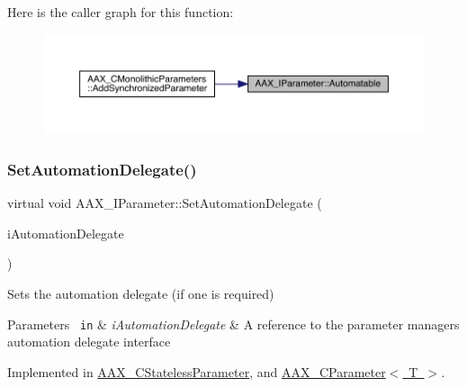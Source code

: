 Here is the caller graph for this function\+:
\nopagebreak
\begin{figure}[H]
\begin{center}
\leavevmode
\includegraphics[width=350pt]{a01857_a253ff336b79cfb454f07d4fa21f2884f_icgraph}
\end{center}
\end{figure}
\mbox{\label{a01857_a2c3dfdce09a2652f954ea6e4f9e12797}} 
\subsubsection{\texorpdfstring{SetAutomationDelegate()}{SetAutomationDelegate()}}
{\footnotesize\ttfamily virtual void A\+A\+X\+\_\+\+I\+Parameter\+::\+Set\+Automation\+Delegate (\begin{DoxyParamCaption}\item[{\mbox{\hyperlink{a01773}{A\+A\+X\+\_\+\+I\+Automation\+Delegate}} $\ast$}]{i\+Automation\+Delegate }\end{DoxyParamCaption})\hspace{0.3cm}{\ttfamily [pure virtual]}}



Sets the automation delegate (if one is required) 


\begin{DoxyParams}[1]{Parameters}
\mbox{\texttt{ in}}  & {\em i\+Automation\+Delegate} & A reference to the parameter manager\textquotesingle{}s automation delegate interface \\
\hline
\end{DoxyParams}


Implemented in \mbox{\hyperlink{a01541_acaf1f39e881c14fb3b81f9c0c23fea31}{A\+A\+X\+\_\+\+C\+Stateless\+Parameter}}, and \mbox{\hyperlink{a01537_aceb34aeadaca054f318004d49a0bd5b7}{A\+A\+X\+\_\+\+C\+Parameter$<$ T $>$}}.

\mbox{\label{a01857_a74c71243313f9d817c8bcb77550969aa}} 

